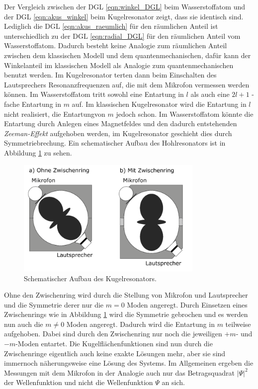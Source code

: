 Der Vergleich zwischen der DGL \eqref{eqn:winkel_DGL} beim Wasserstoffatom und der DGL \eqref{eqn:akus_winkel} beim Kugelresonator zeigt, dass sie identisch sind. Lediglich die DGL \eqref{eqn:akus_raeumlich} für den räumlichen Anteil ist unterschiedlich zu der DGL \eqref{eqn:radial_DGL} für den räumlichen Anteil vom Wasserstoffatom. Dadurch besteht keine Analogie zum räumlichen Anteil zwischen dem klassischen Modell und dem quantenmechanischen, dafür kann der Winkelanteil im klassischen Modell als Analogie zum quantenmechanischen benutzt werden. Im Kugelresonator terten dann beim Einschalten des Lautsprechers Resonanzfrequenzen auf, die mit dem Mikrofon vermessen werden können. Im Wasserstoffatom tritt sowohl eine Entartung in $l$ als auch eine $2l+1$ -fache Entartung in $m$ auf. Im klassischen Kugelresonator wird die Entartung in $l$ nicht realisiert, die Entartungvon $m$ jedoch schon. Im Wasserstoffatom könnte die Entartung durch Anlegen eines Magnetfeldes und den dadurch entstehenden \textit{Zeeman-Effekt} aufgehoben werden, im Kugelresonator geschieht dies durch Symmetriebrechung. Ein schematischer Aufbau des Hohlresonators ist in Abbildung \ref{fig:modell} zu sehen.

\begin{figure}[H]
    \centering
    \includegraphics[width=0.8\textwidth]{build/Skizze.PNG}
    \caption{Schematischer Aufbau des Kugelresonators. \cite{Anleitung}}
    \label{fig:modell}
\end{figure}

Ohne den Zwischenring wird durch die Stellung von Mikrofon und Lautsprecher und die Symmetrie derer nur die $m=0$ Moden angeregt. Durch Einsetzen eines Zwischenrings wie in Abbildung \ref{fig:modell} wird die Symmetrie gebrochen und es werden nun auch die $m \neq 0$ Moden angeregt. Dadurch wird die Entartung in $m$ teilweise aufgehoben. Dabei sind durch den Zwischenring nur noch die jeweiligen $+m$- und $-m$-Moden entartet. Die Kugelflächenfunktionen sind nun durch die Zwischenringe eigentlich auch keine exakte Lösungen mehr, aber sie sind immernoch näherungsweise eine Lösung des Systems. Im Allgemeinen ergeben die Messungen mit dem Mikrofon in der Analogie auch nur das Betragsquadrat $|\Psi|^2$ der Wellenfunktion und nicht die Wellenfunktion $\Psi$ an sich.

